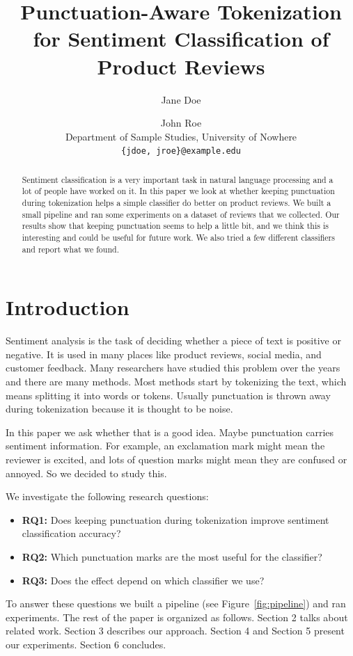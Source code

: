 \documentclass[11pt]{article}
\title{Punctuation-Aware Tokenization for Sentiment Classification of Product Reviews}
\author{Jane Doe \and John Roe \\ Department of Sample Studies, University of Nowhere \\ \texttt{\{jdoe, jroe\}@example.edu}}
\date{}
\begin{document}
\maketitle

\begin{abstract}
Sentiment classification is a very important task in natural language
processing and a lot of people have worked on it. In this paper we look at
whether keeping punctuation during tokenization helps a simple classifier do
better on product reviews. We built a small pipeline and ran some experiments
on a dataset of reviews that we collected. Our results show that keeping
punctuation seems to help a little bit, and we think this is interesting and
could be useful for future work. We also tried a few different classifiers and
report what we found.
\end{abstract}

\section{Introduction}

Sentiment analysis is the task of deciding whether a piece of text is positive
or negative. It is used in many places like product reviews, social media, and
customer feedback. Many researchers have studied this problem over the years
and there are many methods. Most methods start by tokenizing the text, which
means splitting it into words or tokens. Usually punctuation is thrown away
during tokenization because it is thought to be noise.

In this paper we ask whether that is a good idea. Maybe punctuation carries
sentiment information. For example, an exclamation mark might mean the reviewer
is excited, and lots of question marks might mean they are confused or annoyed.
So we decided to study this.

We investigate the following research questions:
\begin{itemize}
    \item \textbf{RQ1:} Does keeping punctuation during tokenization improve
    sentiment classification accuracy?
    \item \textbf{RQ2:} Which punctuation marks are the most useful for the
    classifier?
    \item \textbf{RQ3:} Does the effect depend on which classifier we use?
\end{itemize}

To answer these questions we built a pipeline (see Figure~\ref{fig:pipeline})
and ran experiments. The rest of the paper is organized as follows. Section 2
talks about related work. Section 3 describes our approach. Section 4 and
Section 5 present our experiments. Section 6 concludes.
\end{document}
